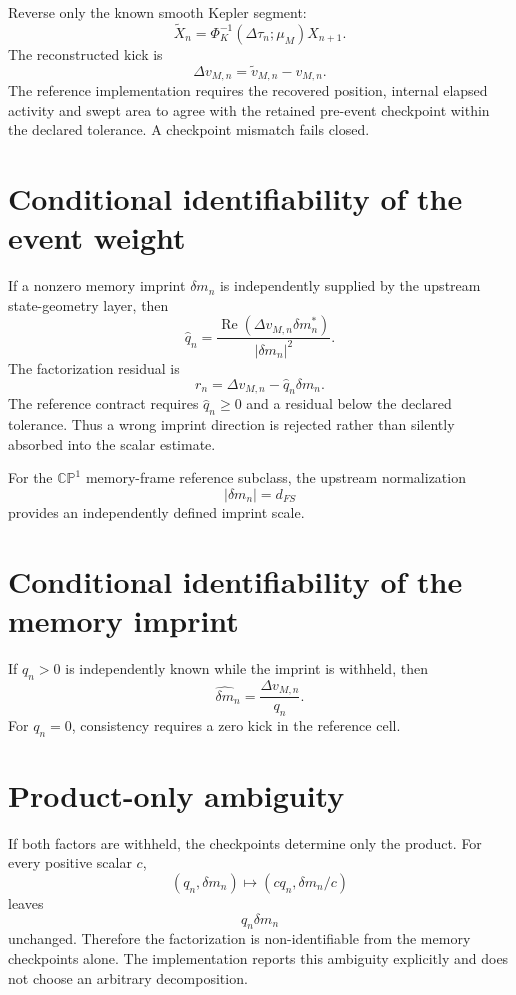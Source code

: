Reverse only the known smooth Kepler segment:
\[
\widetilde X_n
=\Phi_K^{-1}(\Delta\tau_n;\mu_M)X_{n+1}.
\]
The reconstructed kick is
\[
\boxed{
\Delta v_{M,n}
=\widetilde v_{M,n}-v_{M,n}.
}
\]
The reference implementation requires the recovered position, internal elapsed activity and swept area to agree with the retained pre-event checkpoint within the declared tolerance. A checkpoint mismatch fails closed.

\section{Conditional identifiability of the event weight}

If a nonzero memory imprint \(\delta m_n\) is independently supplied by the upstream state-geometry layer, then
\[
\boxed{
\widehat q_n
=
\frac{\operatorname{Re}(\Delta v_{M,n}\delta m_n^*)}
{|\delta m_n|^2}.
}
\]
The factorization residual is
\[
\boxed{
r_n
=\Delta v_{M,n}-\widehat q_n\delta m_n.
}
\]
The reference contract requires \(\widehat q_n\ge0\) and a residual below the declared tolerance. Thus a wrong imprint direction is rejected rather than silently absorbed into the scalar estimate.

For the \(\mathbb{CP}^1\) memory-frame reference subclass, the upstream normalization
\[
|\delta m_n|=d_{FS}
\]
provides an independently defined imprint scale.

\section{Conditional identifiability of the memory imprint}

If \(q_n>0\) is independently known while the imprint is withheld, then
\[
\boxed{
\widehat{\delta m}_n
=\frac{\Delta v_{M,n}}{q_n}.
}
\]
For \(q_n=0\), consistency requires a zero kick in the reference cell.

\section{Product-only ambiguity}

If both factors are withheld, the checkpoints determine only the product. For every positive scalar \(c\),
\[
\boxed{
(q_n,\delta m_n)
\mapsto
(cq_n,\delta m_n/c)
}
\]
leaves
\[
q_n\delta m_n
\]
unchanged. Therefore the factorization is non-identifiable from the memory checkpoints alone. The implementation reports this ambiguity explicitly and does not choose an arbitrary decomposition.

